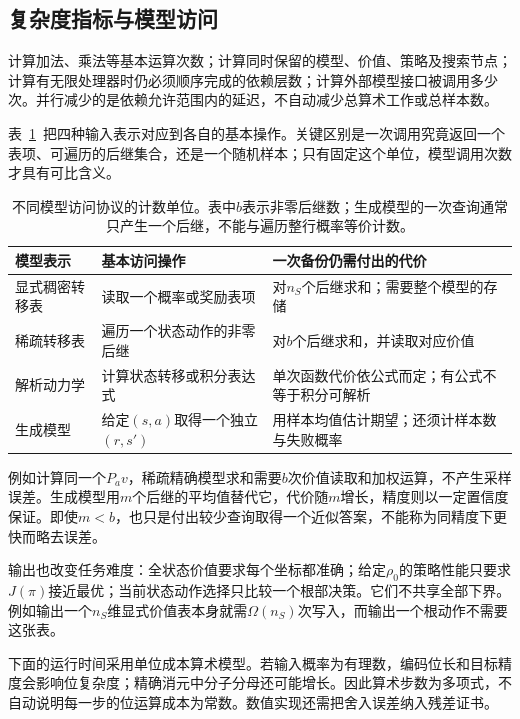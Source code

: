 \subsection{复杂度指标与模型访问}
\label{sec:rl-planning-access-complexity}

计算加法、乘法等基本运算次数；计算同时保留的模型、价值、策略及搜索节点；计算有无限处理器时仍必须顺序完成的依赖层数；计算外部模型接口被调用多少次。并行减少的是依赖允许范围内的延迟，不自动减少总算术工作或总样本数。

表~\ref{tab:rl-planning-access-models}~把四种输入表示对应到各自的基本操作。关键区别是一次调用究竟返回一个表项、可遍历的后继集合，还是一个随机样本；只有固定这个单位，模型调用次数才具有可比含义。

\begin{table}[htbp]
 \centering
 \small
 \begin{tabularx}{\linewidth}{@{}l>{\raggedright\arraybackslash}X>{\raggedright\arraybackslash}X@{}}
  \toprule
  模型表示 & 基本访问操作 & 一次备份仍需付出的代价\\
  \midrule
  显式稠密转移表 & 读取一个概率或奖励表项 & 对$n_S$个后继求和；需要整个模型的存储\\
  稀疏转移表 & 遍历一个状态动作的非零后继 & 对$b$个后继求和，并读取对应价值\\
  解析动力学 & 计算状态转移或积分表达式 & 单次函数代价依公式而定；有公式不等于积分可解析\\
  生成模型 & 给定$(s,a)$取得一个独立$(r,s')$ & 用样本均值估计期望；还须计样本数与失败概率\\
  \bottomrule
 \end{tabularx}
 \caption{不同模型访问协议的计数单位。表中$b$表示非零后继数；生成模型的一次查询通常只产生一个后继，不能与遍历整行概率等价计数。}
 \label{tab:rl-planning-access-models}
\end{table}

例如计算同一个$P_av$，稀疏精确模型求和需要$b$次价值读取和加权运算，不产生采样误差。生成模型用$m$个后继的平均值替代它，代价随$m$增长，精度则以一定置信度保证。即使$m<b$，也只是付出较少查询取得一个近似答案，不能称为同精度下更快而略去误差。

输出也改变任务难度：全状态价值要求每个坐标都准确；给定$\rho_0$的策略性能只要求$J(\pi)$接近最优；当前状态动作选择只比较一个根部决策。它们不共享全部下界。例如输出一个$n_S$维显式价值表本身就需$\Omega(n_S)$次写入，而输出一个根动作不需要这张表。

下面的运行时间采用单位成本算术模型。若输入概率为有理数，编码位长和目标精度会影响位复杂度；精确消元中分子分母还可能增长。因此算术步数为多项式，不自动说明每一步的位运算成本为常数。数值实现还需把舍入误差纳入残差证书。

